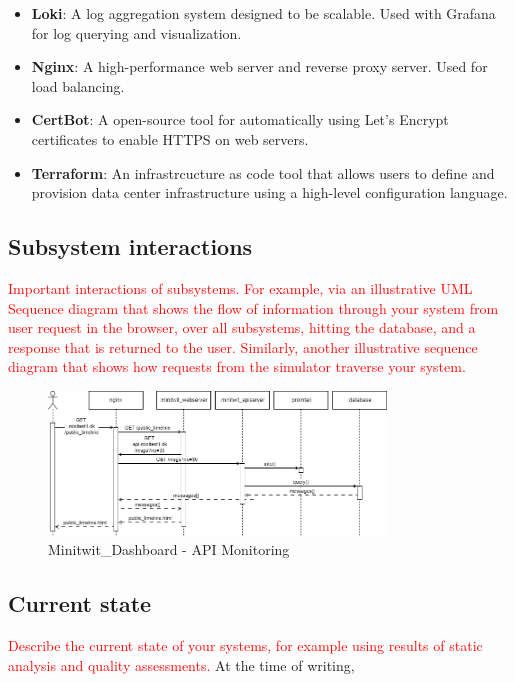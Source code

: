 \begin{multicols}{2}
\begin{itemize}
        \item \textbf{Loki}: A log aggregation system designed to be scalable. Used with Grafana for log querying and visualization.
        \item \textbf{Nginx}: A high-performance web server and reverse proxy server. Used for load balancing.
        \item \textbf{CertBot}: A open-source tool for automatically using Let's Encrypt certificates to enable HTTPS on web servers.
        \item \textbf{Terraform}: An infrastrcucture as code tool that allows users to define and provision data center infrastructure using a high-level configuration language. %
    \end{itemize}
\end{multicols}



\subsection{Subsystem interactions}
\textcolor{red}{Important interactions of subsystems.
For example, via an illustrative UML Sequence diagram that shows the flow of information through your system from user request in the browser, over all subsystems, hitting the database, and a response that is returned to the user.
Similarly, another illustrative sequence diagram that shows how requests from the simulator traverse your system.}
\begin{figure}[H]
    \centering
    \includegraphics[width=0.8\textwidth]{images/sequence.png}
    \caption{Minitwit\_Dashboard - API Monitoring}
    \label{fig:monitor_good}
\end{figure}
\subsection{Current state}
\textcolor{red}{Describe the current state of your systems, for example using results of static analysis and quality assessments.}
At the time of writing, 

